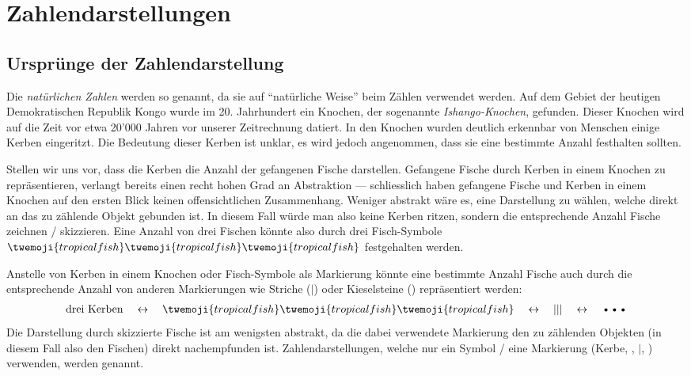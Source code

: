 \chapter{Zahlendarstellungen}

\section{Ursprünge der Zahlendarstellung}
Die \textit{natürlichen Zahlen} werden so genannt, da sie auf \enquote{natürliche Weise} beim Zählen verwendet werden.
Auf dem Gebiet der heutigen Demokratischen Republik Kongo wurde im 20. Jahrhundert ein Knochen, der sogenannte \textit{Ishango-Knochen}, gefunden.
Dieser Knochen wird auf die Zeit vor etwa 20'000 Jahren vor unserer Zeitrechnung datiert.
In den Knochen wurden deutlich erkennbar von Menschen einige Kerben eingeritzt.
Die Bedeutung dieser Kerben ist unklar, es wird jedoch angenommen, dass sie eine bestimmte Anzahl festhalten sollten.

Stellen wir uns vor, dass die Kerben die Anzahl der gefangenen Fische darstellen.
Gefangene Fische durch Kerben in einem Knochen zu repräsentieren, verlangt bereits einen recht hohen Grad an
Abstraktion --- schliesslich haben gefangene Fische und Kerben in einem Knochen auf den ersten Blick keinen offensichtlichen Zusammenhang.
Weniger abstrakt wäre es, eine Darstellung zu wählen, welche direkt an das zu zählende Objekt gebunden ist.
In diesem Fall würde man also keine Kerben ritzen, sondern die entsprechende Anzahl Fische zeichnen / skizzieren.
Eine Anzahl von drei Fischen könnte also durch drei Fisch-Symbole $\twemoji{tropical fish}\twemoji{tropical fish}\twemoji{tropical fish}$
festgehalten werden.

Anstelle von Kerben in einem Knochen oder Fisch-Symbole als Markierung könnte eine bestimmte Anzahl Fische auch durch
die entsprechende Anzahl von anderen Markierungen wie Striche ($|$) oder Kieselsteine (\textbullet) repräsentiert werden:
\begin{align*}
	\text{drei Kerben} \quad\leftrightarrow\quad \twemoji{tropical fish}\twemoji{tropical fish}\twemoji{tropical fish} \quad\leftrightarrow\quad |||
	\quad\leftrightarrow\quad \text{\textbullet\textbullet\textbullet}
\end{align*}
Die Darstellung durch skizzierte Fische ist am wenigsten abstrakt, da die dabei verwendete Markierung den zu zählenden Objekten (in diesem Fall also den Fischen) direkt nachempfunden ist.
Zahlendarstellungen, welche nur ein Symbol / eine Markierung (Kerbe, , $|$, \textbullet) verwenden, werden
 genannt.

